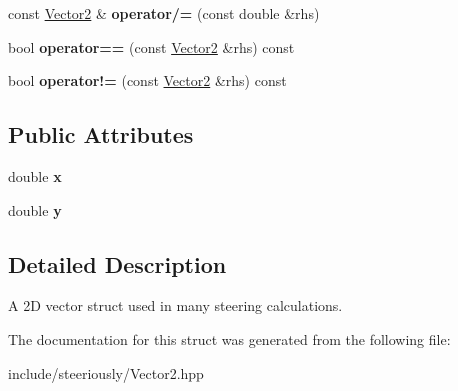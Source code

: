 \begin{DoxyCompactItemize}
\item 
\hypertarget{structsteer_1_1_vector2_a7491e13d88f2f028445fa2218b62bb03}{const \hyperlink{structsteer_1_1_vector2}{Vector2} \& {\bfseries operator/=} (const double \&rhs)}\label{structsteer_1_1_vector2_a7491e13d88f2f028445fa2218b62bb03}

\item 
\hypertarget{structsteer_1_1_vector2_a797fa0001eaaafe3eb90a260f6320c60}{bool {\bfseries operator==} (const \hyperlink{structsteer_1_1_vector2}{Vector2} \&rhs) const }\label{structsteer_1_1_vector2_a797fa0001eaaafe3eb90a260f6320c60}

\item 
\hypertarget{structsteer_1_1_vector2_a667ff2b4dc594a07e19f766dc83125c0}{bool {\bfseries operator!=} (const \hyperlink{structsteer_1_1_vector2}{Vector2} \&rhs) const }\label{structsteer_1_1_vector2_a667ff2b4dc594a07e19f766dc83125c0}

\end{DoxyCompactItemize}
\subsection*{Public Attributes}
\begin{DoxyCompactItemize}
\item 
\hypertarget{structsteer_1_1_vector2_ab7cf735c31ffd694787bf4f611691e3e}{double {\bfseries x}}\label{structsteer_1_1_vector2_ab7cf735c31ffd694787bf4f611691e3e}

\item 
\hypertarget{structsteer_1_1_vector2_a47852c01f7b228b5c18515e27ba5a394}{double {\bfseries y}}\label{structsteer_1_1_vector2_a47852c01f7b228b5c18515e27ba5a394}

\end{DoxyCompactItemize}


\subsection{Detailed Description}
A 2\-D vector struct used in many steering calculations. 

The documentation for this struct was generated from the following file\-:\begin{DoxyCompactItemize}
\item 
include/steeriously/Vector2.\-hpp\end{DoxyCompactItemize}
